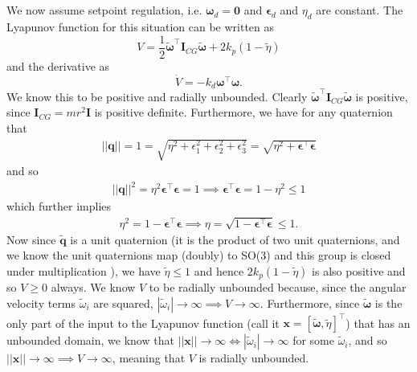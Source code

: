 \subsection{}
We now assume setpoint regulation, i.e. $\boldsymbol{\omega}_d = \mathbf{0}$ and $\boldsymbol{\epsilon}_d$ and $\eta_d$ are constant. The Lyapunov function for this situation can be written as
 \begin{equation}
	 V = \frac{1}{2} \tilde{\boldsymbol{\omega}}^{\top} \mathbf{I}_{CG}\tilde{\boldsymbol{\omega}} + 2 k_p (1-\tilde{\eta})
 \end{equation}
and the derivative as
\begin{equation}
        \label{eq:V_dot}
	\dot{V} = -k_d \boldsymbol{\omega}^{\top} \boldsymbol{\omega}.
\end{equation}
We know this to be positive and radially unbounded. Clearly $\tilde{\boldsymbol{\omega}}^\top\mathbf{I}_{CG}\boldsymbol{\tilde \omega}$ is positive, since $\mathbf{I}_{CG} = mr^2\mathbf{I}$ is positive definite. Furthermore, we have for any quaternion that
\begin{equation}\begin{aligned}
||\mathbf{q}|| = 1 = \sqrt{\eta^2 + \epsilon_1^2 + \epsilon_2^2 + \epsilon_3^2}
= \sqrt{\eta^2 + \boldsymbol{\epsilon}^\top \boldsymbol{\epsilon}}
\end{aligned}\end{equation}
and so
\begin{equation}\begin{aligned}
||\mathbf{q}||^2 = \eta^2 \boldsymbol{\epsilon}^\top\boldsymbol{\epsilon} = 1
\implies \boldsymbol{\epsilon}^\top \boldsymbol{\epsilon} = 1 - \eta^2 \leq 1
\end{aligned}\end{equation}
which further implies
\begin{equation}\begin{aligned}
\eta^2 = 1 - \boldsymbol{\epsilon}^\top \boldsymbol{\epsilon}
\implies \eta = \sqrt{1 - \boldsymbol{\epsilon}^\top \boldsymbol{\epsilon}} \leq 1.
\end{aligned}\end{equation}
Now since $\tilde{\mathbf{q}}$ is a unit quaternion (it is the product of two unit quaternions, and we know the unit quaternions map (doubly) to SO(3) and this group is closed under multiplication \cite{Sola}), we have $\tilde \eta \leq 1$ and hence $2k_p(1-\tilde \eta)$ is also positive and so $V \geq 0$ always.
We know $V$ to be radially unbounded because, since the angular velocity terms $\tilde{\omega}_i$ are squared, $|\tilde{\omega}_i| \rightarrow \infty \implies V \rightarrow \infty$. Furthermore, since $\tilde{\boldsymbol{\omega}}$ is the only part of the input to the Lyapunov function (call it $\mathbf{x}=[\tilde{\boldsymbol{\omega}}, \tilde{\eta}]^\top$) that has an unbounded domain, we know that $||\mathbf{x}|| \rightarrow \infty \iff |\tilde{\omega}_i| \rightarrow \infty$ for some $\tilde{\omega}_i$, and so $||\mathbf{x}|| \rightarrow \infty \implies V \rightarrow \infty$, meaning that $V$ is radially unbounded.

